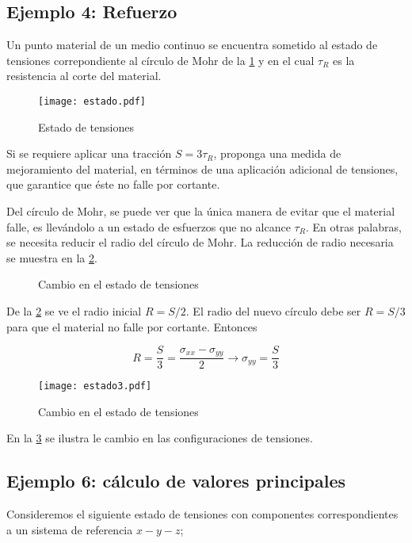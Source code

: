 \documentclass[../notas medios.tex]{subfiles}
\begin{document}
\subsection*{Ejemplo 4: Refuerzo}

Un punto material de un medio continuo se encuentra sometido al estado de tensiones correpondiente al círculo de Mohr de la \cref{estado} y en el cual  $\tau_R$ es la resistencia al corte del material.

\begin{figure}[h]
	\centering
	\texttt{[image: estado.pdf]} 
	\caption{Estado de tensiones}
	\label{estado}
\end{figure}

Si se requiere aplicar una tracción $S = 3\tau_R$,  proponga una medida de mejoramiento del material, en términos de una aplicación adicional de tensiones, que garantice que éste no falle por cortante.

Del círculo de Mohr, se puede ver que la única manera de evitar que el material falle, es llevándolo a un estado de esfuerzos que no alcance $\tau_R$. En otras palabras, se necesita reducir el radio del círculo de Mohr. La reducción de radio necesaria se muestra en la \cref{modif}. 


\begin{figure}[H]
	\centering
	\caption{Cambio en el estado de tensiones}
	\label{modif}
\end{figure}

De la \cref{modif} se ve el radio inicial $R=S/2$. El radio del nuevo círculo debe ser $R=S/3$ para que el material no falle por cortante. Entonces


\begin{equation*}
R = \frac{S}{3} =  \frac{\sigma_{xx} - \sigma_{yy}}{2} \rightarrow
\sigma_{yy} = \frac{S}{3}
\end{equation*}

\begin{figure}[h]
	\centering
	\texttt{[image: estado3.pdf]} 
	\caption{Cambio en el estado de tensiones}
	\label{estado3}
\end{figure}

En la \cref{estado3} se ilustra le cambio en las configuraciones de tensiones.






\subsection*{Ejemplo 6: cálculo de valores principales}
Consideremos el siguiente estado de tensiones con componentes correspondientes a un sistema de referencia $x-y-z$;
\end{document}
